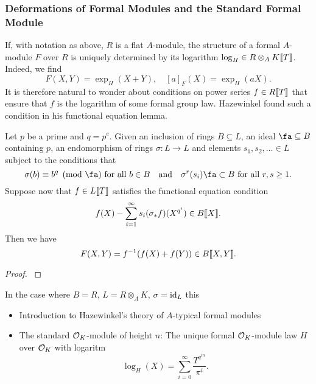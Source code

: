\subsubsection{Deformations of Formal Modules and the Standard Formal Module} %
\label{ssub:Deformations of Formal Modules and the Standard Formal Module}
If, with notation as above, $R$ is a flat $A$-module, the structure of a formal
$A$-module $F$ over $R$ is uniquely determined by its logarithm $\log_H
\in R \otimes_A K \llbracket T \rrbracket$. Indeed, we find
\begin{equation*}
  F(X,Y) = \exp_H(X+Y), \quad [a]_F(X) = \exp_H(a X).
\end{equation*}
It is therefore natural to wonder about conditions on power series $f \in
R\llbracket T \rrbracket$ that ensure that $f$ is the logarithm of some formal group law. 
Hazewinkel found such a condition in his functional equation lemma.

\begin{prop} 
  Let $p$ be a prime and $q = p^e$. Given an inclusion of rings $B \subseteq
  L$, an ideal $\fa \subseteq B$ containing $p$, an endomorphism of rings
  $\sigma: L \to L$ and elements $s_1, s_2, \dots \in L$ subject to the conditions
  that 
  \begin{equation*}
    \sigma(b) \equiv b^q \pmod \fa \text{ for all } b \in B \quad \text{and} \quad 
    \sigma^r(s_i) \fa \subset B \text{ for all } r,s \geq 1.
  \end{equation*}
  Suppose now that $f \in L\llbracket T \rrbracket$ satisfies the functional equation condition
  \begin{equation*}
    f(X) - \sum_{i=1}^\infty s_i (\sigma_* f)(X^{q^i}) \in B\llbracket X \rrbracket.
  \end{equation*}
  Then we have 
  \begin{equation*}
    F(X,Y) = f^{-1}(f(X) + f(Y)) \in B \llbracket X,Y \rrbracket.
  \end{equation*}
\begin{proof}
  \cite[Sections 2 and 10]{hazewinkel1978formal}
\end{proof}
\end{prop}
In the case where $B = R$, $L = R \otimes_A K$, $\sigma = \operatorname{id}_L$ this 


\begin{itemize}
  \item Introduction to Hazewinkel's theory of $A$-typical formal modules
  \item The standard $\mathcal{O}_K$-module of height $n$: The unique formal $\mathcal{O}_K$-module law $H$ over
    $\mathcal{O}_K$ with logaritm 
    \begin{equation*}
      \log_H(X) = \sum_{i = 0}^\infty \frac{T^{q^{in}}}{\pi^i}.
    \end{equation*}
\end{itemize}

